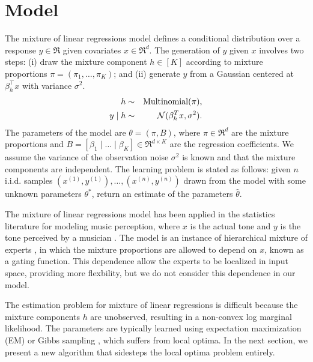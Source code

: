 \section{Model}
\label{sec:model}

\newcommand{\xn}[1]{x^{(#1)}}
\newcommand{\xni}{\xn{i}}
\newcommand{\yn}[1]{y^{(#1)}}
\newcommand{\yni}{\yn{i}}

The mixture of linear regressions model \citep{VieleTong2002} defines
a conditional distribution over a response $y \in \Re$
given covariates $x \in \Re^d$.
The generation of $y$ given $x$ involves two steps:
(i) draw the mixture component $h \in [K]$ according to mixture proportions
$\pi = (\pi_1, \dots, \pi_K)$;
and (ii) generate $y$ from a Gaussian centered at $\beta_h^\top x$ with
variance $\sigma^2$.
\begin{eqnarray*}
  h &\sim& \operatorname{Multinomial}(\pi), \\
  y \mid h &\sim& \mathcal{N}( \beta_{h}^T x,  \sigma^2 ).
\end{eqnarray*}
The parameters of the model are $\theta = (\pi, B)$,
where $\pi \in \Re^d$ are the mixture proportions and
$B = [\beta_1 \mid \dots \mid \beta_K] \in \Re^{d \times K}$
are the regression coefficients.
We assume the variance of the observation noise $\sigma^2$ is known and that the mixture components are independent.
The learning problem is stated as follows:
given $n$ i.i.d. samples $(\xn{1}, \yn{1}), \dots, (\xn{n}, \yn{n})$
drawn from the model with some unknown parameters $\theta^*$,
return an estimate of the parameters $\hat\theta$.

The mixture of linear regressions model has been applied
in the statistics literature for modeling music perception, where $x$ is the
actual tone and $y$ is the tone perceived by a musician \cite{VieleTong2002}.
The model is an instance of hierarchical mixture of experts
\cite{jacobs91experts}, in which the mixture proportions are allowed to depend
on $x$, known as a gating function.
This dependence allow the experts to be localized in input space,
providing more flexbility, but we do not consider this dependence in our model.

The estimation problem for mixture of linear regressions is difficult because
the mixture components $h$ are unobserved,
resulting in a non-convex log marginal likelihood.
The parameters are typically learned using
expectation maximization (EM) or Gibbs sampling \cite{VieleTong2002},
which suffers from local optima.
In the next section, we present a new algorithm
that sidesteps the local optima problem entirely.
